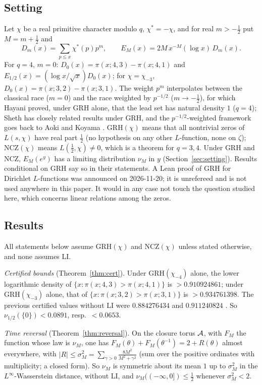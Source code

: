 \subsection{Setting}
Let $\chi$ be a real primitive character modulo $q$, $\chi^*=-\chi$, and for real $m>-\frac12$ put $M=m+\frac12$ and
\[
D_m(x)=\sum_{p\le x}\chi^*(p)p^m,\qquad E_M(x)=2M\,x^{-M}(\log x)\,D_m(x).
\]
For $q=4$, $m=0$: $D_0(x)=\pi(x;4,3)-\pi(x;4,1)$ and $E_{1/2}(x)=(\log x/\sqrt x)D_0(x)$; for $\chi=\chi_{-3}$, $D_0(x)=\pi(x;3,2)-\pi(x;3,1)$. The weight $p^m$ interpolates between the classical race ($m=0$) and the race weighted by $p^{-1/2}$ ($m\to-\frac12$), for which Hayani \cite[Corollary~1.2]{Hayani} proved, under GRH alone, that the lead set has natural density $1$ ($q=4$); Sheth \cite{Sheth} has closely related results under GRH, and the $p^{-1/2}$-weighted framework goes back to Aoki and Koyama \cite{AK}. GRH$(\chi)$ means that all nontrivial zeros of $L(s,\chi)$ have real part $\frac12$ (no hypothesis on any other $L$-function, none on $\zeta$); NCZ$(\chi)$ means $L(\frac12,\chi)\ne0$, which is a theorem for $q=3,4$. Under GRH and NCZ, $E_M(e^y)$ has a limiting distribution $\nu_M$ in $y$ (Section~\ref{sec:setting}). Results conditional on GRH say so in their statements. A Lean proof of GRH for Dirichlet $L$-functions was announced on 2026-11-20; it is unrefereed and is not used anywhere in this paper. It would in any case not touch the question studied here, which concerns linear relations among the zeros.

\subsection{Results}
All statements below assume GRH$(\chi)$ and NCZ$(\chi)$ unless stated otherwise, and none assumes LI.

\emph{Certified bounds} (Theorem~\ref{thm:cert}). Under GRH$(\chi_{-4})$ alone, the lower logarithmic density of $\{x:\pi(x;4,3)>\pi(x;4,1)\}$ is $>0.910924861$; under GRH$(\chi_{-3})$ alone, that of $\{x:\pi(x;3,2)>\pi(x;3,1)\}$ is $>0.934761398$. The previous certified values without LI were $0.884276434$ and $0.911240824$ \cite{GO}. So $\nu_{1/2}(\{0\})<0.0891$, resp.\ $<0.0653$.

\emph{Time reversal} (Theorem~\ref{thm:reversal}). On the closure torus $\mathcal A$, with $F_M$ the function whose law is $\nu_M$, one has $F_M(\theta)+F_M(\theta^{-1})=2+R(\theta)$ almost everywhere, with $|R|\le\sigma_M^2=\sum_{\gamma>0}\frac{8M^2}{M^2+\gamma^2}$ (sum over the positive ordinates with multiplicity; a closed form). So $\nu_M$ is symmetric about its mean $1$ up to $\sigma_M^2$ in the $L^\infty$-Wasserstein distance, without LI, and $\nu_M((-\infty,0])\le\frac12$ whenever $\sigma_M^2<2$.

